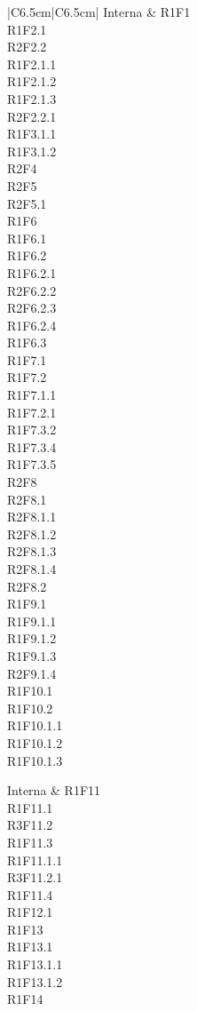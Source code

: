 \begin{longtable}{|C{6.5cm}|C{6.5cm}|}
	Interna &
	\centering
	R1F1\\
	R1F2.1 \\
	R2F2.2\\
	R1F2.1.1\\
	R1F2.1.2\\
	R1F2.1.3\\
	R2F2.2.1\\
	R1F3.1.1\\
	R1F3.1.2\\
	R2F4\\
	R2F5\\
	R2F5.1\\
	R1F6\\
	R1F6.1\\
	R1F6.2\\
	R1F6.2.1\\
	R2F6.2.2\\
	R2F6.2.3\\
	R1F6.2.4\\
	R1F6.3\\
	R1F7.1\\
	R1F7.2\\
	R1F7.1.1\\
	R1F7.2.1\\
	R1F7.3.2\\
	R1F7.3.4\\
	R1F7.3.5\\
	R2F8\\
	R2F8.1\\
	R2F8.1.1\\
	R2F8.1.2\\
	R2F8.1.3\\
	R2F8.1.4\\
	R2F8.2\\
	R1F9.1\\
	R1F9.1.1\\
	R1F9.1.2\\
	R1F9.1.3\\
	R2F9.1.4\\
	R1F10.1\\
	R1F10.2\\
	R1F10.1.1\\
	R1F10.1.2\\
	R1F10.1.3\\

	\tabularnewline

	Interna &
	\centering
	R1F11\\
	R1F11.1\\
	R3F11.2\\
	R1F11.3\\
	R1F11.1.1\\
	R3F11.2.1\\
	R1F11.4\\
	R1F12.1\\
	R1F13\\
	R1F13.1\\
	R1F13.1.1\\
	R1F13.1.2\\
	R1F14\\


\end{longtable}
